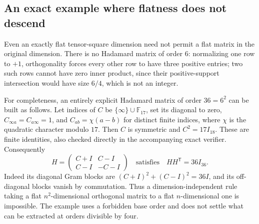 \subsection{An exact example where flatness does not descend}
Even an exactly flat tensor-square dimension need not permit a flat
matrix in the original dimension. There is no Hadamard matrix of order
$6$: normalizing one row to $+1$, orthogonality forces every other row
to have three positive entries; two such rows cannot have zero inner
product, since their positive-support intersection would have size
$6/4$, which is not an integer.

For completeness, an entirely explicit Hadamard matrix of order
$36=6^2$ can be built as follows. Let indices of $C$ be
$\{\infty\}\cup\mathbb F_{17}$, set its diagonal to zero,
$C_{\infty a}=C_{a\infty}=1$, and
$C_{ab}=\chi(a-b)$ for distinct finite indices, where $\chi$ is the
quadratic character modulo $17$. Then $C$ is symmetric and
$C^2=17I_{18}$. These are finite identities, also checked directly in
the accompanying exact verifier. Consequently
\[
 H=\begin{pmatrix}C+I&C-I\\ C-I&-C-I\end{pmatrix}
 \quad\text{satisfies}\quad HH^{\mathsf T}=36I_{36}.
\]
Indeed its diagonal Gram blocks are
$(C+I)^2+(C-I)^2=36I$, and its off-diagonal blocks vanish by
commutation. Thus a dimension-independent rule taking a flat
$n^2$-dimensional orthogonal matrix to a flat $n$-dimensional one is
impossible. The example uses a forbidden base order and does not
settle what can be extracted at orders divisible by four.
